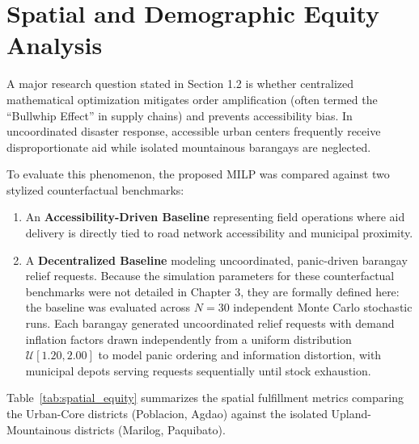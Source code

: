 \section{Spatial and Demographic Equity Analysis}
\label{sec:spatial_equity}

A major research question stated in Section 1.2 is whether centralized mathematical optimization mitigates order amplification (often termed the ``Bullwhip Effect'' in supply chains) and prevents accessibility bias. In uncoordinated disaster response, accessible urban centers frequently receive disproportionate aid while isolated mountainous barangays are neglected.

To evaluate this phenomenon, the proposed MILP was compared against two stylized counterfactual benchmarks:
\begin{enumerate}
    \item An \textbf{Accessibility-Driven Baseline} representing field operations where aid delivery is directly tied to road network accessibility and municipal proximity.
    \item A \textbf{Decentralized Baseline} modeling uncoordinated, panic-driven barangay relief requests. Because the simulation parameters for these counterfactual benchmarks were not detailed in Chapter 3, they are formally defined here: the baseline was evaluated across $N = 30$ independent Monte Carlo stochastic runs. Each barangay generated uncoordinated relief requests with demand inflation factors drawn independently from a uniform distribution $\mathcal{U}[1.20, 2.00]$ to model panic ordering and information distortion, with municipal depots serving requests sequentially until stock exhaustion.
\end{enumerate}

Table~\ref{tab:spatial_equity} summarizes the spatial fulfillment metrics comparing the Urban-Core districts (Poblacion, Agdao) against the isolated Upland-Mountainous districts (Marilog, Paquibato).

